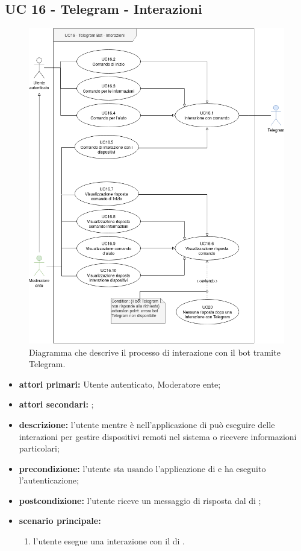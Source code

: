 \subsection{UC 16 - Telegram - Interazioni}
		
	\begin{figure}[H]
		\centering
		\includegraphics[scale=0.60]{res/images/uc16}
		\caption{Diagramma che descrive il processo di interazione con il bot tramite Telegram.}
	\end{figure}
		
	\begin{itemize}
		\item \textbf{attori primari:} Utente autenticato, Moderatore ente;
		\item \textbf{attori secondari:} ;
		\item \textbf{descrizione:} l'utente mentre è nell'applicazione di  può eseguire delle interazioni per gestire dispositivi remoti nel sistema o ricevere informazioni particolari;
		\item \textbf{precondizione:} l'utente sta usando l'applicazione di  e ha eseguito l'autenticazione;
		\item \textbf{postcondizione:} l'utente riceve un messaggio di risposta dal  di ;
		\item \textbf{scenario principale:}
		\begin{enumerate}
			\item l'utente esegue una interazione con il  di .
		\end{enumerate}
	\end{itemize}
	
